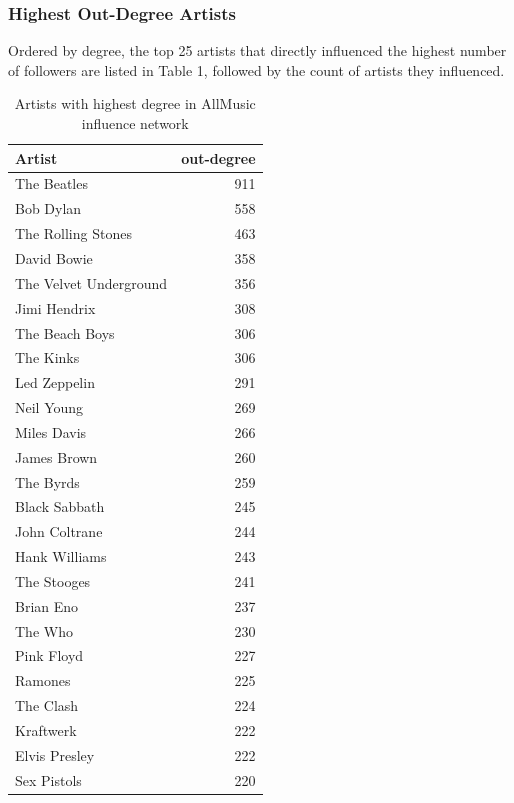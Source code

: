 \subsubsection*{Highest Out-Degree Artists}
Ordered by degree, the top 25 artists that directly influenced the highest number of followers are listed in Table 1, followed by the count of artists they influenced.


\begin{table}[H]
\centering
\caption{Artists with highest degree in AllMusic influence network}
\label{my-label}
\begin{tabular}{lr}
\hline
 Artist                 &   out-degree \\
\hline
 The Beatles            &         911 \\
 Bob Dylan              &         558 \\
 The Rolling Stones     &         463 \\
 David Bowie            &         358 \\
 The Velvet Underground &         356 \\
 Jimi Hendrix           &         308 \\
 The Beach Boys         &         306 \\
 The Kinks              &         306 \\
 Led Zeppelin           &         291 \\
 Neil Young             &         269 \\
 Miles Davis            &         266 \\
 James Brown            &         260 \\
 The Byrds              &         259 \\
 Black Sabbath          &         245 \\
 John Coltrane          &         244 \\
 Hank Williams          &         243 \\
 The Stooges            &         241 \\
 Brian Eno              &         237 \\
 The Who                &         230 \\
 Pink Floyd             &         227 \\
 Ramones                &         225 \\
 The Clash              &         224 \\
 Kraftwerk              &         222 \\
 Elvis Presley          &         222 \\
 Sex Pistols            &         220 \\
\hline
\end{tabular}
\end{table}

